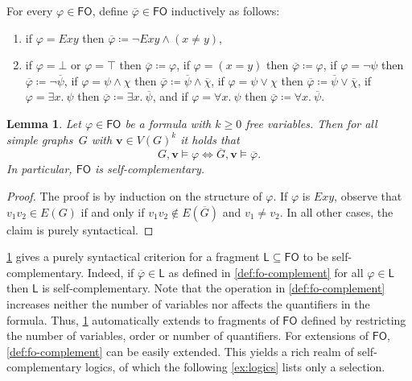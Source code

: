 \documentclass[3p,final]{elsarticle}
\renewcommand\phi\varphi
\newtheorem{lemma}[theorem]{Lemma}
\begin{document}
	\begin{definition} \label{def:fo-complement}
		For every $\phi \in \mathsf{FO}$, define $\overline{\phi} \in \mathsf{FO}$ inductively as follows:
			\begin{enumerate}
				\item if $\phi = Exy$ then $\overline{\phi} \coloneqq \neg Exy \land (x \neq y)$,
				\item if $\phi = \bot$ or $\phi = \top$ then $\overline{\phi} \coloneqq \phi$,
				 if $\phi = (x = y)$ then $\overline{\phi} \coloneqq \phi$,
				 if $\phi = \neg \psi$ then $\overline{\phi} \coloneqq \neg \overline{\psi}$,
				 if $\phi = \psi \land \chi$ then $\overline{\phi} \coloneqq \overline{\psi} \land \overline{\chi}$,
				 if $\phi = \psi \lor \chi$ then $\overline{\phi} \coloneqq \overline{\psi} \lor \overline{\chi}$,
				 if $\phi = \exists x.\ \psi$ then $\overline{\phi} \coloneqq \exists x.\ \overline{\psi}$, and
				 if $\phi = \forall x.\ \psi$ then $\overline{\phi} \coloneqq \forall x.\ \overline{\psi}$.
			\end{enumerate}
	\end{definition}
	
	\begin{lemma} \label{lem:semantics-complemtary-formula}
		Let $\phi \in \mathsf{FO}$ be a formula with $k \geq 0$ free variables.
		Then for all simple graphs~$G$ with $\boldsymbol{v} \in V(G)^k$ it holds that
		\[
		G, \boldsymbol{v} \models \phi \iff 
		\overline{G}, \boldsymbol{v} \models \overline{\phi}.
		\]
		In particular, $\mathsf{FO}$ is self-complementary.
	\end{lemma}
	\begin{proof}
		The proof is by induction on the structure of $\phi$.
		If $\phi$ is $Exy$, observe that $v_1v_2 \in E(G)$ if and only if $v_1v_2 \not\in E(\overline{G})$ and $v_1 \neq v_2$.
		In all other cases, the claim is purely syntactical. 
	\end{proof}
	
	\cref{lem:semantics-complemtary-formula} gives a purely syntactical criterion for a fragment $\mathsf{L} \subseteq \mathsf{FO}$ to be self-complementary. Indeed, if $\overline{\phi} \in \mathsf{L}$ as defined in \cref{def:fo-complement} for all $\phi \in \mathsf{L}$ then $\mathsf{L}$ is self-complementary. 
	Note that the operation in \cref{def:fo-complement} increases neither the number of variables nor affects the quantifiers in the formula.
	Thus, \cref{lem:semantics-complemtary-formula} automatically extends to fragments of $\mathsf{FO}$ defined by restricting the number of variables, order or number of quantifiers.
	For extensions of $\mathsf{FO}$, \cref{def:fo-complement} can be easily extended.
	This yields a rich realm of self-complementary logics, of which the following \cref{ex:logics}  lists only a selection.
	
\end{document}
